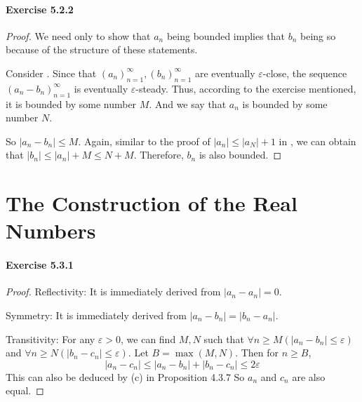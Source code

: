 \paragraph{Exercise 5.2.2} \label{exercise5.2.2}
\begin{proof}
We need only to show that $a_n$ being bounded implies that $b_n$ being so because of the structure of these statements. 

Consider . Since that $(a_n)^\infty_{n=1},(b_n)^\infty_{n=1}$ are eventually $\varepsilon$-close, the sequence 
$(a_n-b_n)^\infty_{n=1}$ is eventually $\varepsilon$-steady. Thus, according to the exercise mentioned, it is bounded by some number $M$. And 
we say that $a_n$ is bounded by some number $N$.

So $|a_n-b_n| \leq M$. Again, similar to the proof of $|a_n| \leq |a_N|+1$ in , we can obtain that 
$|b_n| \leq |a_n| + M \leq N+M$. Therefore, $b_n$ is also bounded.
\end{proof}

\section{The Construction of the Real Numbers}
\paragraph{Exercise 5.3.1} \label{exercise5.3.1}
\begin{proof}
Reflectivity: It is immediately derived from $|a_n-a_n| = 0$.

Symmetry: It is immediately derived from $|a_n-b_n| = |b_n-a_n|$.

Transitivity: For any $\varepsilon >0$, we can find $M,N$ such that $\forall n\geq M(|a_n-b_n| \leq \varepsilon)$ and 
$\forall n\geq N(|b_n-c_n| \leq \varepsilon)$. Let $B = \max{(M,N)}$. Then for $n\geq B$,
\[
|a_n-c_n| \leq |a_n-b_n| + |b_n-c_n| \leq 2\varepsilon
\]
This can also be deduced by (c) in Proposition 4.3.7
So $a_n$ and $c_n$ are also equal.
\end{proof}

